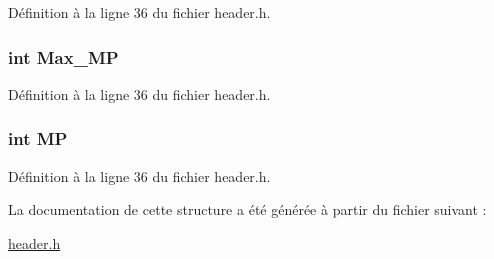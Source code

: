 Définition à la ligne 36 du fichier header.\-h.

\hypertarget{structt__status_a5e48a681ff3d92aaa0e643fbc32ab2f7}{
\subsubsection[{Max\-\_\-\-M\-P}]{\setlength{\rightskip}{0pt plus 5cm}int Max\-\_\-\-M\-P}}\label{structt__status_a5e48a681ff3d92aaa0e643fbc32ab2f7}


Définition à la ligne 36 du fichier header.\-h.

\hypertarget{structt__status_a30fc75b90111fc791752dd1add6ed991}{
\subsubsection[{M\-P}]{\setlength{\rightskip}{0pt plus 5cm}int M\-P}}\label{structt__status_a30fc75b90111fc791752dd1add6ed991}


Définition à la ligne 36 du fichier header.\-h.



La documentation de cette structure a été générée à partir du fichier suivant \-:\begin{DoxyCompactItemize}
\item 
\hyperlink{header_8h}{header.\-h}\end{DoxyCompactItemize}
